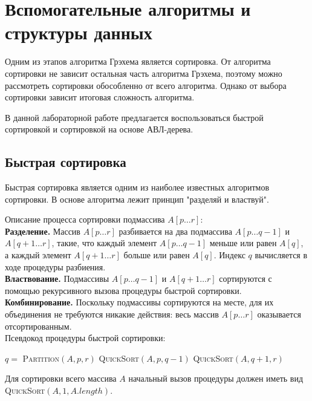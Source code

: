 \section{Вспомогательные алгоритмы и структуры данных}
Одним из этапов алгоритма Грэхема является сортировка. От алгоритма сортировки не зависит остальная часть алгоритма Грэхема, поэтому можно рассмотреть сортировки обособленно от всего алгоритма. Однако от выбора сортировки зависит итоговая сложность алгоритма.

В данной лабораторной работе предлагается воспользоваться быстрой сортировкой и сортировкой на основе АВЛ-дерева.

\subsection[Быстрая сортировка]{Быстрая сортировка\footnotemark}


Быстрая сортировка является одним из наиболее известных алгоритмов сортировки. В основе алгоритма лежит принцип "разделяй и властвуй".

Описание процесса сортировки подмассива $A[p \dots r]$:\\
\textbf{Разделение.} Массив $A[p \dots r]$ разбивается на два подмассива $A[p \dots q-1]$ и $A[q+1 \dots r]$, такие, что каждый элемент $A[p \dots q-1]$ меньше или равен $A[q]$, а каждый элемент $A[q+1 \dots r]$ больше или равен $A[q]$. Индекс $q$ вычисляется в ходе процедуры разбиения.\\
\textbf{Властвование.} Подмассивы $A[p \dots q-1]$ и $A[q+1 \dots r]$ сортируются с помощью рекурсивного вызова процедуры быстрой сортировки.\\
\textbf{Комбинирование.} Поскольку подмассивы сортируются на месте, для их объединения не требуются никакие действия: весь массив $A[p \dots r]$ оказывается отсортированным.\\

\noindent Псевдокод процедуры быстрой сортировки:
\begin{algorithmic}[1]
			\State $q =$ \textsc{Partition}$(A,p,r)$
			\State \textsc{QuickSort}$(A,p,q-1)$
			\State \textsc{QuickSort}$(A,q+1,r)$
		\EndIf
	\EndProcedure
\end{algorithmic}

Для сортировки всего массива $A$ начальный вызов процедуры должен иметь вид
\textsc{QuickSort}$(A,1,A.length)$.


